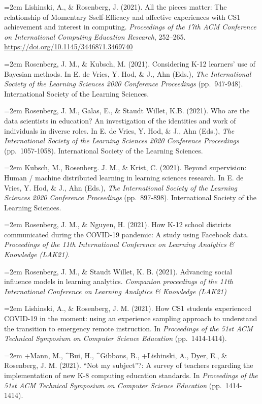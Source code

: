 \documentclass[
  14,
]{article}
\begin{document}
\hangindent=2em Lishinski, A., \& Rosenberg, J. (2021). All the pieces
matter: The relationship of Momentary Sself-Efficacy and affective
experiences with CS1 achievement and interest in computing.
\emph{Proceedings of the 17th ACM Conference on International Computing
Education Research}, 252--265.
\url{https://doi.org/10.1145/3446871.3469740}

\hangindent=2em Rosenberg, J. M., \& Kubsch, M. (2021). Considering K-12
learners' use of Bayesian methods. In E. de Vries, Y. Hod, \& J., Ahn
(Eds.), \emph{The International Society of the Learning Sciences 2020
Conference Proceedings} (pp.~947-948). International Society of the
Learning Sciences.

\hangindent=2em Rosenberg, J. M., Galas, E., \& Staudt Willet, K.B.
(2021). Who are the data scientists in education? An investigation of
the identities and work of individuals in diverse roles. In E. de Vries,
Y. Hod, \& J., Ahn (Eds.), \emph{The International Society of the
Learning Sciences 2020 Conference Proceedings} (pp.~1057-1058).
International Society of the Learning Sciences.

\hangindent=2em Kubsch, M., Rosenberg. J. M., \& Krist, C. (2021).
Beyond supervision: Human / machine distributed learning in learning
sciences research. In E. de Vries, Y. Hod, \& J., Ahn (Eds.), \emph{The
International Society of the Learning Sciences 2020 Conference
Proceedings} (pp.~897-898). International Society of the Learning
Sciences.

\hangindent=2em Rosenberg, J. M., \& Nguyen, H. (2021). How K-12 school
districts communicated during the COVID-19 pandemic: A study using
Facebook data. \emph{Proceedings of the 11th International Conference on
Learning Analytics \& Knowledge (LAK21)}.

\hangindent=2em Rosenberg, J. M., \& Staudt Willet, K. B. (2021).
Advancing social influence models in learning analytics. \emph{Companion
proceedings of the 11th International Conference on Learning Analytics
\& Knowledge (LAK21)}

\hangindent=2em Lishinski, A., \& Rosenberg, J. M. (2021). How CS1
students experienced COVID-19 in the moment: using an experience
sampling approach to understand the transition to emergency remote
instruction. In \emph{Proceedings of the 51st ACM Technical Symposium on
Computer Science Education} (pp.~1414-1414).

\hangindent=2em +Mann, M., \^{}Bui, H., \^{}Gibbons, B., +Lishinski, A.,
Dyer, E., \& Rosenberg, J. M. (2021). ``Not my subject''?: A survey of
teachers regarding the implementation of new K-8 computing education
standards. In \emph{Proceedings of the 51st ACM Technical Symposium on
Computer Science Education} (pp.~1414-1414).
\end{document}
